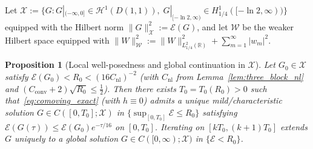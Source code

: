 \documentclass[11pt,a4paper]{article}
\newtheorem{prop}{Proposition}[section]
\begin{document}
Let $\mathcal{X} := \{G : G|_{(-\infty,0]}\in\mathcal{H}^1(D(1,1)),\; G|_{[-\ln 2,\infty)}\in H^1_{1/4}([-\ln 2,\infty))\}$
equipped with the Hilbert norm $\|G\|_{\mathcal{X}}^2 := \mathcal{E}(G)$, and let
$\mathcal{W}$ be the weaker Hilbert space equipped with $\|W\|_{\mathcal{W}}^2 := \|W\|_{L^2_{1/4}(\mathbb{R})}^2 + \sum_{m=1}^\infty|w_m|^2$.

\begin{prop}[Local well-posedness and global continuation in $\mathcal{X}$]\label{prop:lwp}
Let $G_0\in\mathcal{X}$ satisfy $\mathcal{E}(G_0) < R_0 < (16 C_{\mathrm{nl}})^{-2}$ (with $C_{\mathrm{nl}}$ from Lemma~\ref{lem:three_block_nl}
and $(C_{\mathrm{conv}}+2)\sqrt{R_0}\le\frac{1}{2}$).
Then there exists $T_0 = T_0(R_0) > 0$ such that~\eqref{eq:comoving_exact} (with $h\equiv 0$) admits a unique mild/characteristic
solution $G\in C([0,T_0];\mathcal{X})$ in $\{\sup_{[0,T_0]}\mathcal{E}\le R_0\}$ satisfying
$\mathcal{E}(G(\tau))\le\mathcal{E}(G_0)e^{-\tau/16}$ on $[0,T_0]$.
Iterating on $[k T_0, (k+1)T_0]$ extends $G$ uniquely to a global solution $G\in C([0,\infty);\mathcal{X})$ in $\{\mathcal{E}<R_0\}$.
\end{prop}
\end{document}
